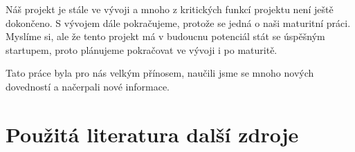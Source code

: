 \documentclass[12pt,a4paper]{article}
\begin{document}
Náš projekt je stále ve vývoji a mnoho z kritických funkcí projektu není ještě dokončeno. S vývojem dále pokračujeme, protože se jedná o naši maturitní práci. Myslíme si, ale že tento projekt má v budoucnu potenciál stát se úspěšným startupem, proto plánujeme pokračovat ve vývoji i po maturitě.

Tato práce byla pro nás velkým přínosem, naučili jsme se mnoho nových dovedností a načerpali nové informace.


\clearpage

\section{Použitá literatura další zdroje }
\end{document}
